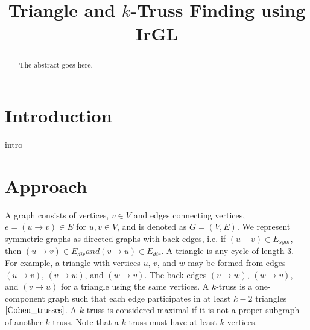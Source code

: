 \documentclass[conference]{IEEEtran}
\begin{document}
\title{Triangle and $k$-Truss Finding using IrGL}
\author{
\and
{}
\and
{}
}
\maketitle

\begin{abstract}
The abstract goes here.
\end{abstract}

\section{Introduction}
intro

\section{Approach}
A graph consists of vertices, $v \in V$ and edges connecting vertices, $e=(u \rightarrow v) \in E$ for $u, v \in V$, and is denoted as $G=(V,E)$. We represent symmetric graphs as directed graphs with back-edges, i.e. if $(u-v) \in E_{sym}$, then $(u \rightarrow v) \in E_{dir} and (v \rightarrow u) \in E_{dir}$.
A triangle is any cycle of length 3. For example, a triangle with vertices $u$, $v$, and $w$ may be formed from edges $(u \rightarrow v)$, $(v \rightarrow w)$, and $(w \rightarrow v)$. The back edges $(v \rightarrow w)$, $(w \rightarrow v)$, and $(v \rightarrow u)$ for a triangle using the same vertices.
A $k$-truss is a one-component graph such that each edge participates in at least $k-2$ triangles $\cite{Cohen_trusses}$. A $k$-truss is considered maximal if it is not a proper subgraph of another $k$-truss. Note that a $k$-truss must have at least $k$ vertices.
\end{document}
